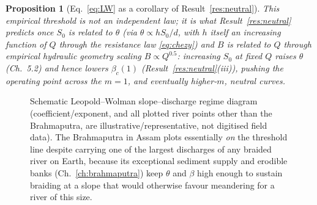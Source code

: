 \documentclass[11pt,a4paper]{report}
\theoremstyle{definition}
\theoremstyle{plain}
\newtheorem{proposition}{Proposition}[chapter]
\theoremstyle{remark}
\begin{document}
\begin{proposition}[Eq.~\eqref{eq:LW} as a corollary of Result~\ref{res:neutral}]
This empirical threshold is not an independent law; it is what Result~\ref{res:neutral} predicts once $S_0$ is related to $\theta$ (via $\theta \propto h S_0/d$, with $h$ itself an increasing function of $Q$ through the resistance law \eqref{eq:chezy}) and $B$ is related to $Q$ through empirical \emph{hydraulic geometry} scaling $B\propto Q^{0.5}$: increasing $S_0$ at fixed $Q$ raises $\theta$ (Ch.~5.2) and hence lowers $\beta_c(1)$ (Result~\ref{res:neutral}(iii)), pushing the operating point across the $m=1$, and eventually higher-$m$, neutral curves.
\end{proposition}

\begin{figure}[h!]
\centering
{}
\caption{Schematic Leopold--Wolman slope--discharge regime diagram (coefficient/exponent, and all plotted river points other than the Brahmaputra, are illustrative/representative, not digitised field data). The Brahmaputra in Assam plots essentially \emph{on} the threshold line despite carrying one of the largest discharges of any braided river on Earth, because its exceptional sediment supply and erodible banks (Ch.~\ref{ch:brahmaputra}) keep $\theta$ and $\beta$ high enough to sustain braiding at a slope that would otherwise favour meandering for a river of this size.}
\label{fig:LWdiagram}
\end{figure}
\end{document}
